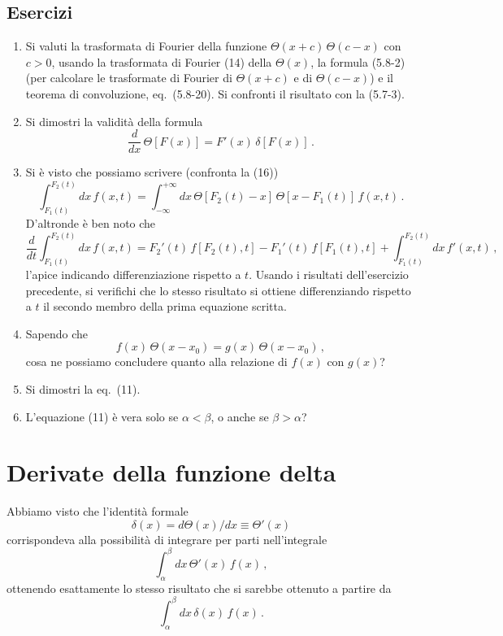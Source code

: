 \documentclass[11pt, a4paper]{book}
\numberwithin{equation}{section}
\newenvironment{esercizi}{\subsection*{Esercizi}\begin{enumerate}}{\end{enumerate}}
\begin{document}
\begin{esercizi}
\item Si valuti la trasformata di Fourier della funzione $\Theta(x+c)\,\Theta(c-x)$ con $c > 0$, usando la trasformata di Fourier (14) della $\Theta(x)$, la formula (5.8-2) (per calcolare le trasformate di Fourier di $\Theta(x+c)$ e di $\Theta(c-x)$) e il teorema di convoluzione, eq.~(5.8-20). Si confronti il risultato con la (5.7-3).
\item Si dimostri la validità della formula
\[
\frac{d}{dx}\,\Theta[F(x)] = F'(x)\,\delta[F(x)] \,.
\]
\item Si è visto che possiamo scrivere (confronta la (16))
\[
\int_{F_1(t)}^{F_2(t)} dx\, f(x,t) = \int_{-\infty}^{+\infty} dx\, \Theta[F_2(t) - x]\,\Theta[x - F_1(t)]\, f(x,t) \,.
\]
D'altronde è ben noto che
\[
\frac{d}{dt} \int_{F_1(t)}^{F_2(t)} dx\, f(x,t) = F_2'(t)\, f[F_2(t), t] - F_1'(t)\, f[F_1(t), t] + \int_{F_1(t)}^{F_2(t)} dx\, f'(x,t) \,,
\]
l'apice indicando differenziazione rispetto a $t$. Usando i risultati dell'esercizio precedente, si verifichi che lo stesso risultato si ottiene differenziando rispetto a $t$ il secondo membro della prima equazione scritta.
\item Sapendo che
\[
f(x)\,\Theta(x - x_0) = g(x)\,\Theta(x - x_0) \,,
\]
cosa ne possiamo concludere quanto alla relazione di $f(x)$ con $g(x)$?
\item Si dimostri la eq.~(11).
\item L'equazione (11) è vera solo se $\alpha < \beta$, o anche se $\beta > \alpha$?
\end{esercizi}

\section{Derivate della funzione delta}

Abbiamo visto che l'identità formale
\begin{equation}
\delta(x) = d\Theta(x)/dx \equiv \Theta'(x) \tag{1}
\end{equation}
corrispondeva alla possibilità di integrare per parti nell'integrale
\begin{equation}
\int_{\alpha}^{\beta} dx\, \Theta'(x)\, f(x) \,, \tag{2}
\end{equation}
ottenendo esattamente lo stesso risultato che si sarebbe ottenuto a partire da
\begin{equation}
\int_{\alpha}^{\beta} dx\, \delta(x)\, f(x) \,. \tag{3}
\end{equation}
\end{document}
